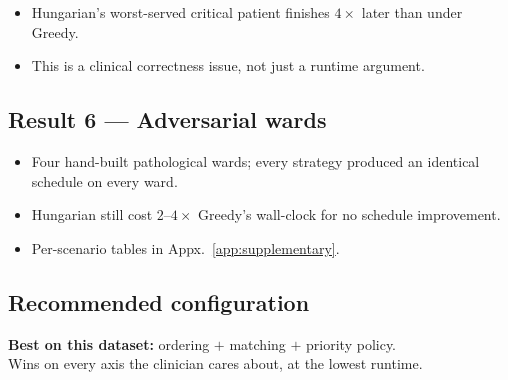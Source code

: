 \begin{itemize}
  \item Hungarian's worst-served critical patient finishes
        $4\times$ later than under Greedy.
  \item This is a clinical correctness issue, not just a runtime
        argument.
\end{itemize}

\subsection{Result 6 --- Adversarial wards}

\begin{itemize}
  \item Four hand-built pathological wards;
        every strategy produced an identical schedule on every
        ward.
  \item Hungarian still cost $2$--$4\times$ Greedy's wall-clock for
        no schedule improvement.
  \item Per-scenario tables in Appx.~\ref{app:supplementary}.
\end{itemize}

\subsection{Recommended configuration}

\begin{insightbox}
\textbf{Best on this dataset:}\; ordering $+$
 matching $+$  priority
policy.\\[0.2em]
Wins on every axis the clinician cares about, at the lowest
runtime.
\end{insightbox}
